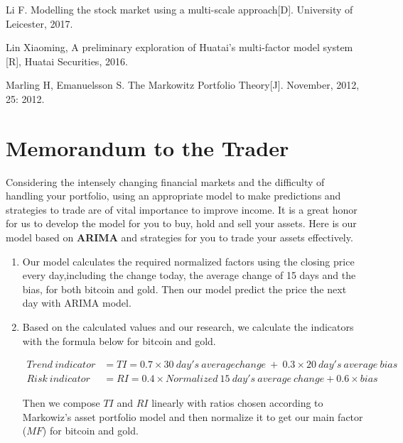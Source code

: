 \documentclass[12pt,a4paper]{article}
\newcommand{\Predictor}{ARIMA }
\begin{document}
\begin{spacing}{1.2}
\begin{thebibliography}{00}
Li F. Modelling the stock market using a multi-scale approach[D]. University of Leicester, 2017.

Lin Xiaoming, A preliminary exploration of Huatai's multi-factor model system [R], Huatai Securities, 2016.

Marling H, Emanuelsson S. The Markowitz Portfolio Theory[J]. November, 2012, 25: 2012.


\end{thebibliography}


\addtocounter{page}{-1}
\thispagestyle{empty}

\newpage
\addtocounter{page}{-1}
\thispagestyle{empty}

{\centering\section*{Memorandum to the Trader}}

Considering the intensely changing financial markets and the difficulty of handling your portfolio, using an appropriate model to make predictions and strategies to trade are of vital importance to improve income. It is a great honor for us to develop the model for you to buy, hold and sell your assets. Here is our model based on \textbf{\Predictor} and strategies for you to trade your assets effectively.  
	
\begin{enumerate}
	\item Our model calculates the required normalized factors using the closing price every day,including the change today, the average change of 15 days and the bias, for both bitcoin and gold. Then our model predict the price the next day with ARIMA model.
	 
	\item Based on the calculated values and our research, we calculate the indicators with the formula below for bitcoin and gold. 
	

\begin{align*}
	Trend \ indicator &= TI = 0.7 \times 30 \ day's \ average change \ + \ 0.3 \times 20 \ day's \ average \ bias \\
	Risk \ indicator &= RI = 0.4 \times Normalized \ 15 \ day's \ average \ change + 0.6 \times bias
\end{align*}
	
	Then we compose $TI$ and $RI$ linearly with ratios chosen according to Markowiz's asset portfolio model and then normalize it to get our main factor ($MF$) for bitcoin and gold. 
	

\end{enumerate}
\end{spacing}
\end{document}

